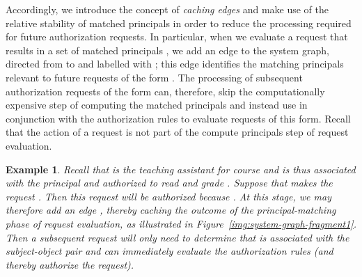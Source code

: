 \documentclass{article}
\newcommand{\interestahead}{*}
\newcommand{\interestdhead}{square}
\newtheorem{example}{Example}
\begin{document}
Accordingly, we introduce the concept of \emph{caching edges} and make use of the relative stability of matched principals in order to reduce the processing required for future authorization requests.
In particular, when we evaluate a request  that results in a set of matched principals , we add an edge  to the system graph, directed from  to  and labelled with ; this edge identifies the matching principals relevant to future requests of the form .
The processing of subsequent authorization requests of the form  can, therefore, skip the computationally expensive step of computing the matched principals and instead use  in conjunction with the authorization rules to evaluate requests of this form.
Recall that the action of a request is not part of the compute principals step of request evaluation.

\begin{example}
Recall that  is the teaching assistant for course  and is thus associated with the principal  and authorized to read and grade .
Suppose that  makes the request .
Then this request will be authorized because .
At this stage, we may therefore add an edge , thereby caching the outcome of the principal-matching phase of request evaluation, as illustrated in Figure~\ref{img:system-graph-fragment1}.
Then a subsequent request  will only need to determine that  is associated with the subject-object pair  and can immediately evaluate the authorization rules (and thereby authorize the request).
\begin{figure}[!ht]\centering\setlength{\extrarowheight}{2pt}
\end{figure}
\end{example}
\end{document}
